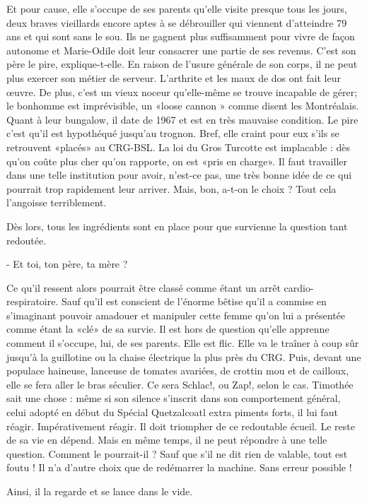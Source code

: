 Et pour cause, elle s’occupe de ses parents qu’elle visite presque tous les jours, deux braves vieillards encore aptes à se débrouiller qui viennent d’atteindre 79 ans et qui sont sans le sou. Ils ne gagnent plus suffisamment pour vivre de façon autonome et Marie-Odile doit leur consacrer une partie de ses revenus. C’est son père le pire, explique-t-elle. En raison de l’usure générale de son corps, il ne peut plus exercer son métier de serveur. L’arthrite et les maux de dos ont fait leur œuvre. De plus, c’est un vieux noceur qu’elle-même se trouve incapable de gérer; le bonhomme est imprévisible, un «loose cannon » comme disent les Montréalais. Quant à leur bungalow, il date de 1967 et est en très mauvaise condition. Le pire c’est qu’il est hypothéqué jusqu’au trognon. Bref, elle craint pour eux s’ils se retrouvent «placés» au CRG-BSL. La loi du Gros Turcotte est implacable : dès qu’on coûte plus cher qu’on rapporte, on est «pris en charge». Il faut travailler dans une telle institution pour avoir, n’est-ce pas, une très bonne idée de ce qui pourrait trop rapidement leur arriver. Mais, bon, a-t-on le choix ? Tout cela l’angoisse terriblement.

Dès lors, tous les ingrédients sont en place pour que survienne la question tant redoutée.

- Et toi, ton père, ta mère ?

Ce qu’il ressent alors pourrait être classé comme étant un arrêt cardio-respiratoire. Sauf qu’il est conscient de l’énorme bêtise qu’il a commise en s’imaginant pouvoir amadouer et manipuler cette femme qu’on lui a présentée comme étant la «clé» de sa survie. Il est hors de question qu’elle apprenne comment il s’occupe, lui, de ses parents. Elle est flic. Elle va le traîner à coup sûr jusqu’à la guillotine ou la chaise électrique la plus près du CRG. Puis, devant une populace haineuse, lanceuse de tomates avariées, de crottin mou et de cailloux, elle se fera aller le bras séculier. Ce sera Schlac!, ou Zap!, selon le cas. Timothée sait une chose : même si son silence s’inscrit dans son comportement général, celui adopté en début du Spécial Quetzalcoatl extra piments forts, il lui faut réagir. Impérativement réagir. Il doit triompher de ce redoutable écueil. Le reste de sa vie en dépend. Mais en même temps, il ne peut répondre à une telle question. Comment le pourrait-il ? Sauf que s’il ne dit rien de valable, tout est foutu ! Il n’a d’autre choix que de redémarrer la machine. Sans erreur possible !

Ainsi, il la regarde et se lance dans le vide.

